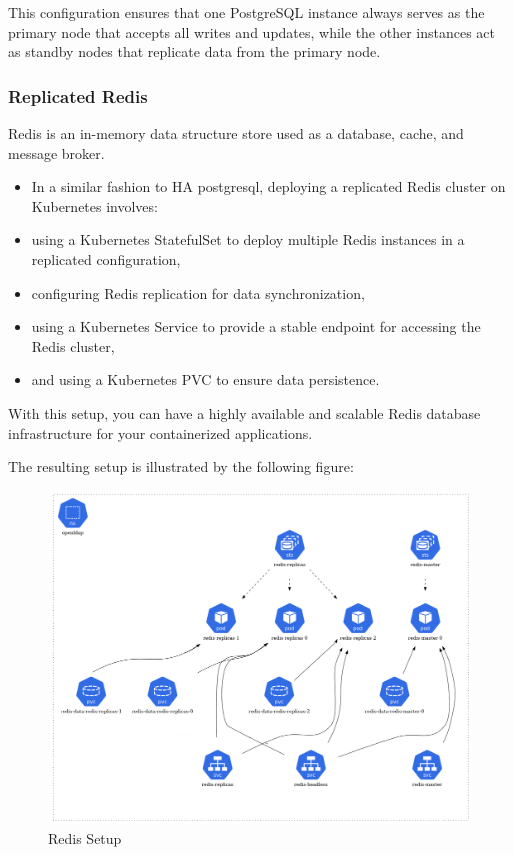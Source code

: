 This configuration ensures that one PostgreSQL instance always serves as the primary node that accepts all writes and updates, while the other instances act as standby nodes that replicate data from the primary node. 

\subsubsection{Replicated Redis }

Redis is an in-memory data structure store used as a database, cache, and message broker. 
\begin{itemize}[label={--}]
\item In a similar fashion to HA postgresql, deploying a replicated Redis cluster on Kubernetes involves: 
\item using a Kubernetes StatefulSet to deploy multiple Redis instances in a replicated configuration, 
\item configuring Redis replication for data synchronization, 
\item using a Kubernetes Service to provide a stable endpoint for accessing the Redis cluster, 
\item and using a Kubernetes PVC to ensure data persistence. 
\end{itemize}
With this setup, you can have a highly available and scalable Redis database infrastructure for your containerized applications. 

The resulting setup is illustrated by the following figure: 

\begin{figure}[H]\centering
\includegraphics[width=1.0\textwidth,angle=00]{assets/f38.png}
\caption{Redis Setup }
\label{fig:Redis Setup}
\end{figure}

